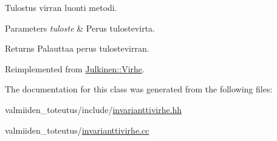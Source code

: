 Tulostus virran luonti metodi. 


\begin{DoxyParams}{Parameters}
{\em tuloste} & Perus tulostevirta. \\
\hline
\end{DoxyParams}
\begin{DoxyReturn}{Returns}
Palauttaa perus tulostevirran. 
\end{DoxyReturn}


Reimplemented from \hyperlink{class_julkinen_1_1_virhe_a36a2644943038f9760b5d76a1960b00d}{Julkinen\+::\+Virhe}.



The documentation for this class was generated from the following files\+:\begin{DoxyCompactItemize}
\item 
valmiiden\+\_\+toteutus/include/\hyperlink{invarianttivirhe_8hh}{invarianttivirhe.\+hh}\item 
valmiiden\+\_\+toteutus/\hyperlink{invarianttivirhe_8cc}{invarianttivirhe.\+cc}\end{DoxyCompactItemize}
